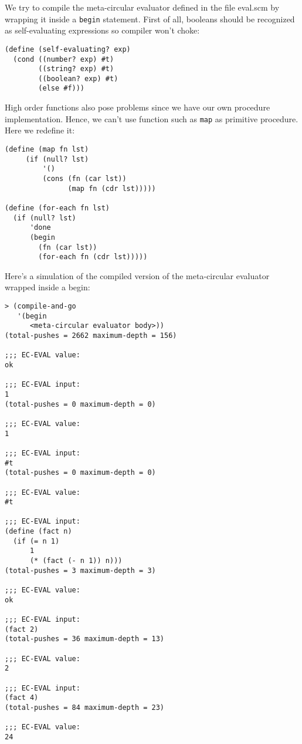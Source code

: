 \documentclass[a4paper,12pt]{article}
\begin{document}
We try to compile the meta-circular evaluator defined in the file
eval.scm by wrapping it inside a \lstinline!begin! statement.  First
of all, booleans should be recognized  as self-evaluating expressions
so compiler won't choke:
\begin{lstlisting}
(define (self-evaluating? exp)
  (cond ((number? exp) #t)
        ((string? exp) #t)
        ((boolean? exp) #t)
        (else #f)))
\end{lstlisting}

High order functions also pose problems since we have our own
procedure implementation.  Hence, we can't use function such as
\lstinline!map! as primitive procedure.  Here we redefine it:

\begin{lstlisting}
(define (map fn lst)
     (if (null? lst)
         '()
         (cons (fn (car lst))
               (map fn (cdr lst)))))

(define (for-each fn lst)
  (if (null? lst)
      'done
      (begin
        (fn (car lst))
        (for-each fn (cdr lst)))))
\end{lstlisting}

Here's a simulation of the compiled version of the meta-circular
evaluator wrapped inside a begin:

\begin{lstlisting}
> (compile-and-go
   '(begin
      <meta-circular evaluator body>))
(total-pushes = 2662 maximum-depth = 156)

;;; EC-EVAL value:
ok

;;; EC-EVAL input:
1
(total-pushes = 0 maximum-depth = 0)

;;; EC-EVAL value:
1

;;; EC-EVAL input:
#t
(total-pushes = 0 maximum-depth = 0)

;;; EC-EVAL value:
#t

;;; EC-EVAL input:
(define (fact n)
  (if (= n 1)
      1
      (* (fact (- n 1)) n)))
(total-pushes = 3 maximum-depth = 3)

;;; EC-EVAL value:
ok

;;; EC-EVAL input:
(fact 2)
(total-pushes = 36 maximum-depth = 13)

;;; EC-EVAL value:
2

;;; EC-EVAL input:
(fact 4)
(total-pushes = 84 maximum-depth = 23)

;;; EC-EVAL value:
24
\end{lstlisting}
\end{document}
